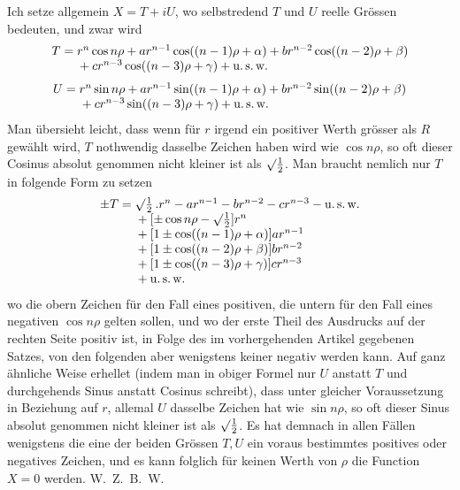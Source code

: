 Ich setze allgemein $X=T+iU$, wo selbstredend $T$ und $U$ reelle Grössen
bedeuten, und zwar wird
\[
\begin{array}{r@{}l}
T={}&r^n\cos n\rho+ar^{n-1}\cos((n-1)\rho+\alpha)+br^{n-2}\cos((n-2)\rho+\beta)\\
&{}+cr^{n-3}\cos((n-3)\rho+\gamma)+\mbox{u.\,s.\,w.}
\end{array}
\]
\[
\begin{array}{r@{}l}
U={}&r^n\sin n\rho+ar^{n-1}\sin((n-1)\rho+\alpha)+br^{n-2}\sin((n-2)\rho+\beta)\\
&{}+cr^{n-3}\sin((n-3)\rho+\gamma)+\mbox{u.\,s.\,w.}
\end{array}
\]
Man übersieht leicht, dass wenn für $r$ irgend ein positiver Werth grösser als $R$
gewählt wird, $T$ nothwendig dasselbe Zeichen haben wird wie $\cos n\rho$, so oft
dieser Cosinus absolut genommen nicht kleiner ist als $\surd\frac12$. Man braucht nemlich
nur $T$ in folgende Form zu setzen
\[
\begin{array}{r@{}l}
\pm T={}&\surd\frac12\,.r^n-ar^{n-1}-br^{n-2}-cr^{n-3}-\mbox{u.\,s.\,w.}\\
&{}+[\pm\cos n\rho-\surd\frac12]r^n\\
&{}+[1\pm\cos((n-1)\rho+\alpha)]ar^{n-1}\\
&{}+[1\pm\cos((n-2)\rho+\beta)]br^{n-2}\\
&{}+[1\pm\cos((n-3)\rho+\gamma)]cr^{n-3}\\
&{}+\mbox{u.\,s.\,w.}
\end{array}
\]
wo die obern Zeichen für den Fall eines positiven, die untern für den Fall eines
negativen $\cos n\rho$ gelten sollen, und wo der erste Theil des Ausdrucks auf der
rechten Seite positiv ist, in Folge des im vorhergehenden Artikel gegebenen Satzes,
von den folgenden aber wenigstens keiner negativ werden kann. Auf ganz ähnliche Weise erhellet (indem man in obiger Formel nur $U$ anstatt $T$ und durchgehends Sinus anstatt Cosinus schreibt), dass unter gleicher Voraussetzung in Beziehung auf $r$, allemal $U$ dasselbe Zeichen hat wie $\sin n\rho$, so oft dieser Sinus
absolut genommen nicht kleiner ist als $\surd\frac12$. Es hat demnach in allen Fällen wenigstens die eine der beiden Grössen $T,U$ ein voraus bestimmtes positives oder
negatives Zeichen, und es kann folglich für keinen Werth von $\rho$ die Function
$X=0$ werden. W.~Z.~B.~W.

